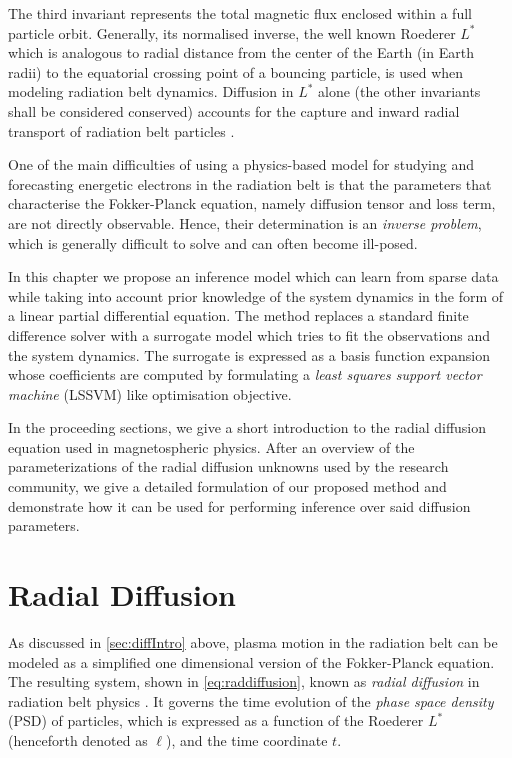 The third invariant represents the total magnetic flux enclosed within a full particle orbit. 
Generally, its normalised inverse, the well known Roederer $L^{*}$ \citep[ch~3]{roederer2012dynamics} which is 
analogous to radial distance from the center of the Earth (in Earth radii) to the equatorial 
crossing point of a bouncing particle, is used when modeling radiation belt dynamics. Diffusion in 
$L^{*}$ alone (the other invariants shall be considered conserved) accounts for the capture and 
inward radial transport of radiation belt particles \citep{JGR:JGR4463,roederer2012dynamics}.

One of the main difficulties of using a physics-based model for studying and forecasting energetic 
electrons in the radiation belt is that the parameters that characterise the Fokker-Planck 
equation, namely diffusion tensor and loss term, are not directly observable. Hence, their 
determination is an \emph{inverse problem}, which is generally difficult to solve and can often 
become ill-posed.

In this chapter we propose an inference model which can learn from sparse data while taking into 
account prior knowledge of the system dynamics in the form of a linear partial differential 
equation. The method replaces a standard finite difference solver with a surrogate model which 
tries to fit the observations and the system dynamics. The surrogate is expressed as a basis 
function expansion whose coefficients are computed by formulating a 
\emph{least squares support vector machine} (LSSVM) like optimisation objective.

In the proceeding sections, we give a short introduction to the radial diffusion equation used in 
magnetospheric physics. After an overview of the parameterizations of the radial diffusion unknowns 
used by the research community, we give a detailed formulation of our proposed method and 
demonstrate how it can be used for performing inference over said diffusion parameters.

\section{Radial Diffusion}\label{sec:radDiffusionIntroduction}

As discussed in \cref{sec:diffIntro} above, plasma motion in the radiation belt can be 
modeled as a simplified one dimensional version of the Fokker-Planck equation. The resulting 
system, shown in \cref{eq:raddiffusion}, known as \emph{radial diffusion} in radiation belt 
physics \citep{JGRA:JGRA9345}. It governs the time evolution of the \emph{phase space density} 
(PSD) of particles, which is expressed as a function of the Roederer $L^{*}$ 
(henceforth denoted as $\ell$), and the time coordinate $t$.

